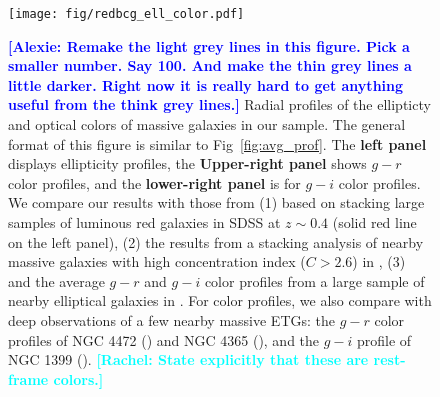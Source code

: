 \documentclass[a4paper,fleqn,usenatbib]{mnras}
\newcommand{\alexie}[1]{\textcolor{blue}{\textbf{[Alexie: #1]}}}
\newcommand{\rachel}[1]{\textcolor{cyan}{\textbf{[Rachel: #1]}}}
\begin{document}
  \begin{figure}
      \centering 
      \texttt{[image: fig/redbcg\_ell\_color.pdf]}
      \caption{\alexie{Remake the light grey lines in this figure. Pick a smaller number. Say 100. And make the thin grey lines a little darker. Right now it is really hard to get anything useful from the think grey lines.}
          Radial profiles of the ellipticty and optical colors of massive galaxies in our sample. The general format of this figure is similar to Fig~\ref{fig:avg_prof}.  The
          \textbf{left panel} displays ellipticity profiles, 
          the \textbf{Upper-right panel} shows $g-r$ color profiles, and  the
          \textbf{lower-right panel} is for $g-i$ color profiles. 
          We compare our results with those from (1) \citet{Tal2011} based on stacking 
          large samples of luminous red galaxies in SDSS at $z{\sim} 0.4$ 
          (solid red line on the left panel), 
          (2) the results from a stacking analysis of nearby massive 
          galaxies with high concentration index ($C>2.6$) in 
          \citet[][blue dash lines on the left and upper-right panels]{DSouza2014}, 
          (3) and the average $g-r$ and $g-i$ color profiles 
          from a large sample of nearby elliptical galaxies in \citet[][blue, solid 
          lines on both right panels]{LaBarbera2010}.
          For color profiles, we also compare with deep observations of a few nearby 
          massive ETGs: the $g-r$ color profiles of NGC 4472 (\citealt{Mihos2013}) 
          and NGC 4365 (\citealt{Mihos2017}), and the $g-i$ profile of NGC 1399 
          (\citealt{Iodice2016}). \rachel{State explicitly that these are rest-frame colors.}
          }
      \label{fig:ell_color}
  \end{figure}
    
\end{document}
